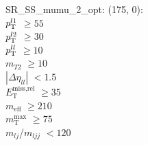 SR\_SS\_mumu\_2\_opt: (175, 0): \\
$p_{\text{T}}^{l1}$ $\geq 55$ \\
$p_{\text{T}}^{l2}$ $\geq 30$ \\
$p_{\text{T}}^{ll}$ $\geq 10$ \\
$m_{T2}$ $\geq 10$ \\
$|\Delta\eta_{ll}|$ $<1.5$ \\
$E_{\text{T}}^{\text{miss,rel}}$ $\geq 35$ \\
$m_{\text{eff}}$ $\geq 210$ \\
$m_{\text{T}}^{\text{max}}$ $\geq 75$ \\
$m_{lj}$/$m_{ljj}$ $<120$ \\
